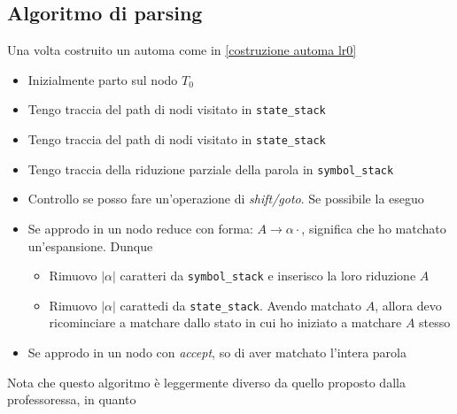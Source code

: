 \subsection{Algoritmo di parsing}
Una volta costruito un automa come in \ref{costruzione automa lr0}
\begin{itemize}
	\item Inizialmente parto sul nodo $ T_0 $
	\item Tengo traccia del path di nodi visitato in \verb|state_stack|
	\item Tengo traccia del path di nodi visitato in \verb|state_stack|
	\item Tengo traccia della riduzione parziale della parola in \verb|symbol_stack|
	\item Controllo se posso fare un'operazione di \textit{shift/goto}. Se possibile la eseguo
	\item Se approdo in un nodo reduce con forma: $ A \rightarrow \alpha \cdot  $, significa che ho matchato un'espansione. Dunque
	      \begin{itemize}
		      \item Rimuovo $ \left|\alpha\right| $ caratteri da \verb|symbol_stack| e inserisco la loro riduzione $ A $
		      \item Rimuovo $ \left|\alpha\right| $ carattedi da \verb|state_stack|. Avendo matchato $ A $, allora devo ricominciare a matchare dallo stato in cui ho iniziato a matchare $ A $ stesso
	      \end{itemize}
	\item Se approdo in un nodo con \textit{accept}, so di aver matchato l'intera parola
\end{itemize}
Nota che questo algoritmo è leggermente diverso da quello proposto dalla professoressa, in quanto
